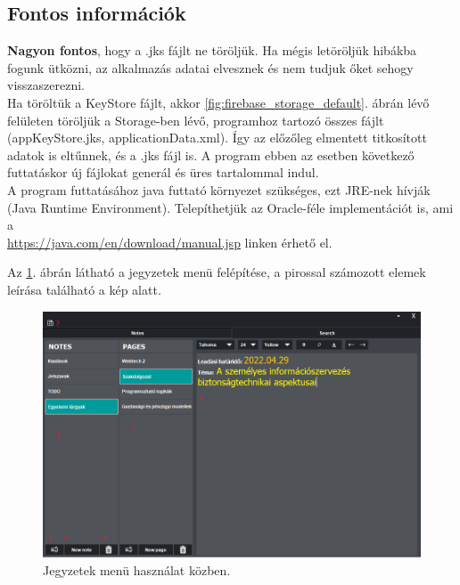 \subsection{Fontos információk}
\textbf{Nagyon fontos}, hogy a .jks fájlt ne töröljük. Ha mégis letöröljük hibákba fogunk ütközni, az alkalmazás adatai elvesznek és nem tudjuk őket sehogy visszaszerezni.
\vspace{5pt}\\Ha töröltük a KeyStore fájlt, akkor \ref{fig:firebase_storage_default}. ábrán lévő felületen töröljük a Storage-ben lévő, programhoz tartozó összes fájlt (appKeyStore.jks, applicationData.xml). Így az előzőleg elmentett titkosított adatok is eltűnnek, és a .jks fájl is. A program ebben az esetben következő futtatáskor új fájlokat generál és üres tartalommal indul.
\vspace{5pt}\\A program futtatásához java futtató környezet szükséges, ezt JRE-nek hívják (Java Runtime Environment). Telepíthetjük az Oracle-féle implementációt is, ami a \\ \href{https://java.com/en/download/manual.jsp}{https://java.com/en/download/manual.jsp} linken érhető el.

\vspace{30pt}

Az \ref{fig:menu_notes_2}. ábrán látható a jegyzetek menü felépítése, a pirossal számozott elemek leírása található a kép alatt.

\begin{figure}[h]
	\centering
	\includegraphics[scale=0.5]{images/doc_1.png}
	\caption{Jegyzetek menü használat közben.}
	\label{fig:menu_notes_2}
\end{figure}

